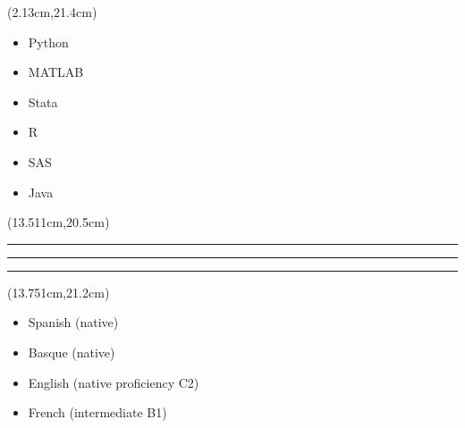 \documentclass{resume}
\renewenvironment{rSection}[1]{
\sectionskip
\vspace{-3.5pt}
\color{NavyBlue}{\hspace{-3pt}\MakeUppercase{\Large{\textbf{#1}}}}
\vspace{3pt}
\color{NavyBlue}
\hrule
\hrule
\hrule
\color{black}
\begin{list}{}{
\setlength{\leftmargin}{1.5em}
}
\item[]
}{
\end{list}
}
\begin{document}
\begin{textblock*}{9.5cm}(2.13cm,21.4cm)
\begin{adjustwidth}{-2mm}{0pt}
\begin{multicols}{2}
\begin{itemize}\setlength\itemsep{2.5pt}
\color{black}
    \item Python
    \item MATLAB %
    \item Stata
    \columnbreak
    \item R
    \item SAS
    \item Java
\end{itemize}
\end{multicols}
\end{adjustwidth}
\end{textblock*}

\begin{textblock*}{7.42cm}(13.511cm,20.5cm)
\begin{rSection}{Languages}
\end{rSection}
\end{textblock*}

\begin{adjustwidth}{-2mm}{0pt}
\begin{textblock*}{7.13cm}(13.751cm,21.2cm)
\begin{itemize}\setlength\itemsep{-1.5pt}
\vspace{8pt}
    \item Spanish \hspace*{5.6pt} \color{LightGrey}(native)\color{black}
    \item Basque \hspace*{7.7pt} \color{LightGrey}(native)\color{black}
    \item English \hspace*{8.5pt} \color{LightGrey}(native proficiency C2)\color{black}
    \item French \hspace*{10pt} \color{LightGrey}(intermediate B1)
\end{itemize}
\end{textblock*}
\end{adjustwidth}
\end{document}
